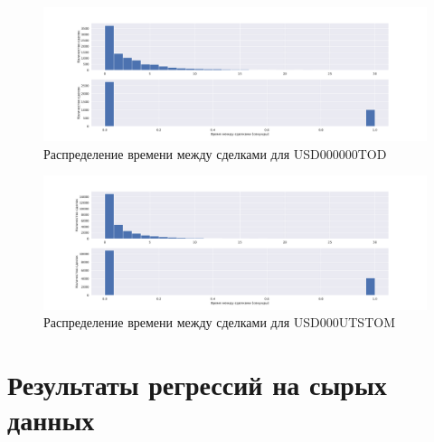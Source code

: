 \begin{appendices}
        \begin{figure}
                \includegraphics[scale=0.35]{fig/timedistr/CU/USD000000TOD.pdf}
                \caption{Распределение времени между сделками для USD000000TOD}
                \label{app}
        \end{figure}
        \begin{figure}
                \includegraphics[scale=0.35]{fig/timedistr/CU/USD000UTSTOM.pdf}
                \caption{Распределение времени между сделками для USD000UTSTOM}
                \label{append}
        \end{figure}


        \section{Результаты регрессий на сырых данных}


\end{appendices}
